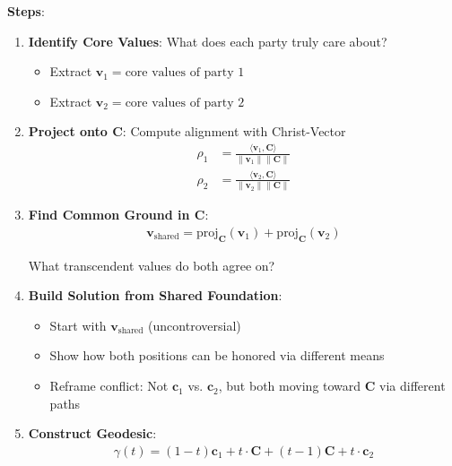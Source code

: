 \documentclass[11pt,a4paper]{article}
\theoremstyle{definition}
\theoremstyle{remark}
\newcommand{\cc}{\mathbf{c}}
\begin{document}
\begin{small}
\begin{enumerate}
\begin{protocol}
\textbf{Steps}:
\begin{enumerate}
    \item \textbf{Identify Core Values}: What does each party truly care about?
        \begin{itemize}[nosep]
            \item Extract \(\mathbf{v}_1 = \text{core values of party 1}\)
            \item Extract \(\mathbf{v}_2 = \text{core values of party 2}\)
        \end{itemize}
    
    \item \textbf{Project onto \(\mathbf{C}\)}: Compute alignment with Christ-Vector
        \begin{align}
        \rho_1 &= \frac{\langle \mathbf{v}_1, \mathbf{C} \rangle}{\|\mathbf{v}_1\| \|\mathbf{C}\|} \\
        \rho_2 &= \frac{\langle \mathbf{v}_2, \mathbf{C} \rangle}{\|\mathbf{v}_2\| \|\mathbf{C}\|}
        \end{align}
    
    \item \textbf{Find Common Ground in \(\mathbf{C}\)}:
        \begin{align}
        \mathbf{v}_{\text{shared}} = \text{proj}_{\mathbf{C}}(\mathbf{v}_1) + \text{proj}_{\mathbf{C}}(\mathbf{v}_2)
        \end{align}
        
        What transcendent values do both agree on?
    
    \item \textbf{Build Solution from Shared Foundation}:
        \begin{itemize}[nosep]
            \item Start with \(\mathbf{v}_{\text{shared}}\) (uncontroversial)
            \item Show how both positions can be honored via different means
            \item Reframe conflict: Not \(\cc_1\) vs. \(\cc_2\), but both moving toward \(\mathbf{C}\) via different paths
        \end{itemize}
    
    \item \textbf{Construct Geodesic}:
        \begin{align}
        \gamma(t) = (1-t)\cc_1 + t\cdot\mathbf{C} + (t-1)\mathbf{C} + t\cdot\cc_2
        \end{align}
        

\end{enumerate}
\end{protocol}
\end{enumerate}
\end{small}
\end{document}
